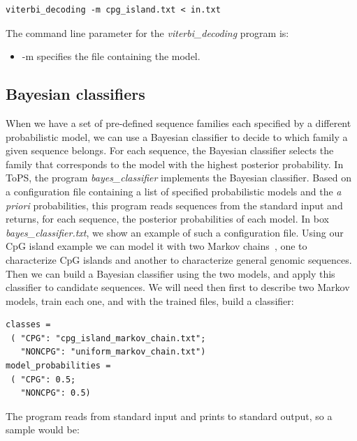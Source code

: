 \documentclass[10pt]{article}
\begin{document}
\begin{Verbatim}[frame=single, label={Command line}]
viterbi_decoding -m cpg_island.txt < in.txt
\end{Verbatim}


The command line parameter for the \textit{viterbi\_decoding} program is:
\begin{itemize}
\item -m specifies the file containing the  model.
\end{itemize}



\subsection*{Bayesian classifiers}

When we have a set of pre-defined sequence families each specified by a different probabilistic model, we can use a Bayesian classifier to decide to which family a given sequence belongs.  For each sequence, the Bayesian classifier selects the family that corresponds to the model with the highest posterior probability. In ToPS, the program \textit{bayes\_classifier} implements the Bayesian classifier. Based on a configuration file containing a list of specified probabilistic models and the {\it a priori} probabilities,  this program reads sequences from the standard input and returns, for each sequence, the posterior probabilities of each model. In box \textit{bayes\_classifier.txt}, we show an example of such a configuration file. Using our CpG island example we can model it with two Markov chains~\cite{Durbin1998}, one to characterize CpG islands and another to characterize general genomic sequences. Then we can build a Bayesian classifier using the two models, and apply this classifier to candidate sequences. We will need then first to describe two Markov models, train each one, and with the trained files, build a classifier:

\vspace{1em}
\begin{Verbatim}[frame=single,  label={bayes\_classifier.txt}]
classes =
 ( "CPG": "cpg_island_markov_chain.txt";
   "NONCPG": "uniform_markov_chain.txt")
model_probabilities =
 ( "CPG": 0.5;
   "NONCPG": 0.5)
\end{Verbatim}

\vspace{1em}

The program reads from standard input and prints to standard output, so a sample would be:
\end{document}
